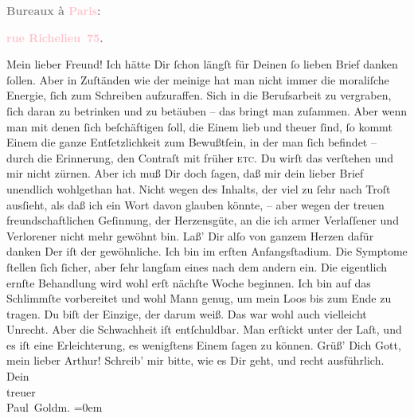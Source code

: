            \begin{otherlanguage}{french}\textcolor{gray}{\textbf{\textbf{Bureaux à \textcolor{pink}{Paris}{}\ledrightnote{\textcolor{pink}{Paris}}:}}}\end{otherlanguage}\pend
           \pstart
           \begin{otherlanguage}{french}\textcolor{gray}{\textbf{\textbf{\textcolor{pink}{rue Richelieu 75}{}\ledrightnote{\textcolor{pink}{rue Richelieu}}.}}}\end{otherlanguage}\pend
           \pstart
           Mein lieber Freund!\pend
           \pstart
           Ich hätte Dir ſchon längſt für Deinen ſo lieben Brief danken ſollen. Aber in
               Zuſtänden wie der meinige hat man nicht immer die moraliſche Energie, ſich zum
               Schreiben aufzuraffen. Sich in die Berufsarbeit zu vergraben, ſich daran zu betrinken
               und zu betäuben – das bringt man zuſammen. Aber wenn man mit denen ſich beſchäftigen
               ſoll, die Einem lieb und theuer ſind, ſo kommt Einem die ganze Entſetzlichkeit zum
               Bewußtſein, in der man ſich befindet – durch die Erin{\pb}nerung, den Contraſt mit früher \textsc{etc}. Du wirſt das
               verſtehen und mir nicht zürnen.\pend
           \pstart
           Aber ich muß Dir doch ſagen, daß mir dein lieber Brief unendlich wohlgethan hat.
               Nicht wegen des Inhalts, der viel zu ſehr nach Troſt ausſieht, als daß ich ein Wort
               davon glauben könnte, – aber wegen der treuen freundschaftlichen Geſinnung, der
               Herzensgüte, an die ich armer Verlaſſener und Verlorener nicht mehr gewöhnt bin. Laß’
               Dir alſo von ganzem Herzen dafür danken{\dotsfour}\pend
           \pstart
           Der \label{K_L02705-1v}\label{K_L02705-1h} iſt der gewöhnliche. Ich bin im erſten Anfangsſtadium. Die Symptome ſtellen
               ſich ſicher, aber ſehr langſam eines nach dem {\pb}andern ein. Die eigentlich ernſte Behandlung wird wohl erſt nächſte Woche beginnen.
               Ich bin auf das Schlimmſte vorbereitet und wohl Mann genug, um mein Loos bis zum Ende
               zu tragen. Du biſt der Einzige, der darum weiß. Das war wohl auch vielleicht Unrecht.
               Aber die Schwachheit iſt entſchuldbar. Man erſtickt unter der Laſt, und es iſt eine
               Erleichterung, es wenigſtens Einem ſagen zu können.\pend
           \pstart
           Grüß’ Dich Gott, mein lieber Arthur! Schreib’ mir bitte, wie es Dir geht, und recht
               ausführlich.\pend
           \pstart
           Dein {\\[\baselineskip]}treuer {\\[\baselineskip]}\spacefill\mbox{Paul Goldm.}\pend
           \leftskip=0em{}\endnumbering{}\begin{anhang}\end{anhang}
      